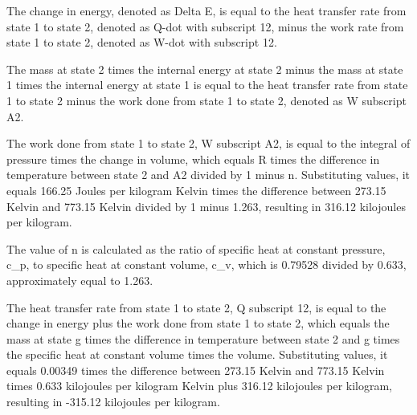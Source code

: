 The change in energy, denoted as Delta E, is equal to the heat transfer rate from state 1 to state 2, denoted as Q-dot with subscript 12, minus the work rate from state 1 to state 2, denoted as W-dot with subscript 12.

The mass at state 2 times the internal energy at state 2 minus the mass at state 1 times the internal energy at state 1 is equal to the heat transfer rate from state 1 to state 2 minus the work done from state 1 to state 2, denoted as W subscript A2.

The work done from state 1 to state 2, W subscript A2, is equal to the integral of pressure times the change in volume, which equals R times the difference in temperature between state 2 and A2 divided by 1 minus n. Substituting values, it equals 166.25 Joules per kilogram Kelvin times the difference between 273.15 Kelvin and 773.15 Kelvin divided by 1 minus 1.263, resulting in 316.12 kilojoules per kilogram.

The value of n is calculated as the ratio of specific heat at constant pressure, c_p, to specific heat at constant volume, c_v, which is 0.79528 divided by 0.633, approximately equal to 1.263.

The heat transfer rate from state 1 to state 2, Q subscript 12, is equal to the change in energy plus the work done from state 1 to state 2, which equals the mass at state g times the difference in temperature between state 2 and g times the specific heat at constant volume times the volume. Substituting values, it equals 0.00349 times the difference between 273.15 Kelvin and 773.15 Kelvin times 0.633 kilojoules per kilogram Kelvin plus 316.12 kilojoules per kilogram, resulting in -315.12 kilojoules per kilogram.